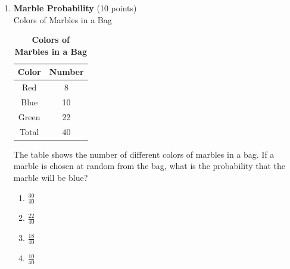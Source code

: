 \begin{enumerate}
  \item \textbf{Marble Probability} (10 points)\\
  Colors of Marbles in a Bag
  \begin{table}[h!]
  \centering
  \renewcommand{\arraystretch}{1.3}
  \setlength{\tabcolsep}{8pt}
  \caption*{\textbf{Colors of Marbles in a Bag}}
  \begin{tabular}{|c|c|}
  \hline
  \rowcolor[HTML]{E0E0E0}
  \textbf{Color} & \textbf{Number} \\
  \hline
  Red & 8 \\
  \hline
  Blue & 10 \\
  \hline
  Green & 22 \\
  \hline
  Total & 40 \\
  \hline
  \end{tabular}
  \end{table}
  The table shows the number of different colors of marbles in a bag. If a marble is chosen at random from the bag, what is the probability that the marble will be blue?
  \begin{enumerate}[label=(\Alph*)]
    \item $\frac{30}{40}$
    \item $\frac{22}{40}$
    \item $\frac{18}{40}$
    \item $\frac{10}{40}$
  \end{enumerate}
  \begin{subanswer}
  \end{subanswer}


\end{enumerate}
